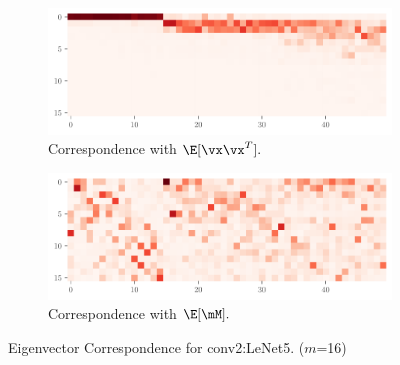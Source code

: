 \begin{figure}[H]
    \centering
    \begin{subfigure}[t]{0.5\textwidth}
        \centering
        \captionsetup{justification=centering}
        \includegraphics[width=\textwidth]{Figures/Correspondence/LeNet5_fixlr0.01/Conv/xxT_Trueest_real_corr_expand_t50_CIFAR10_Exp1_LeNet5_fixlr0.01_E-1_conv2.pdf}
        \caption{Correspondence with $\E[\vx\vx^T].$}
        \label{fig:Corr_xxT_True_conv2}
    \end{subfigure}%
    \begin{subfigure}[t]{0.5\textwidth}
        \centering
        \captionsetup{justification=centering}
        \includegraphics[width=\textwidth]{Figures/Correspondence/LeNet5_fixlr0.01/Conv/UTAU_Trueest_real_corr_expand_t50_CIFAR10_Exp1_LeNet5_fixlr0.01_E-1_conv2.pdf}
        \caption{Correspondence with $\E[\mM].$}
        \label{fig:Corr_UTAU_True_conv2}
    \end{subfigure}
    \caption{Eigenvector Correspondence for conv2:LeNet5. ($m$=16)}
    \label{fig:Corr_conv2}
\end{figure}



